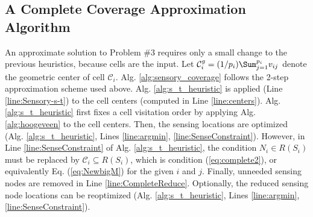 \documentclass[letterpaper, 10 pt, conference]{ieeeconf}
\theoremstyle{definition}
\newcommand{\Cs}{\mathcal{C}}
\begin{document}
\subsection{A Complete Coverage Approximation Algorithm}

\noindent An approximate solution to Problem $\# 3$  requires only a small change to the previous heuristics, because cells are the input.  Let $\Cs^g_i = (1/p_i) \Sum_{j=1}^{p_i}v_{ij} $ denote the geometric center of cell $\Cs_i$. Alg. \ref{alg:sensory_coverage} follows the 2-step approximation scheme used above. Alg. \ref{alg:s_t_heuristic} is applied (Line \ref{line:Sensory-s-t}) to the cell centers (computed in Line \ref{line:centers}).  Alg. \ref{alg:s_t_heuristic} first fixes a cell visitation order by applying Alg. \ref{alg:hoogeveen} to the cell centers.  Then, the sensing locations are optimized (Alg. \ref{alg:s_t_heuristic}, Lines \ref{line:argmin}, \ref{line:SenseConstraint}).  However, in Line \ref{line:SenseConstraint} of Alg. \ref{alg:s_t_heuristic}, the condition $N_i\in R(S_i)$ must be replaced by $\Cs_i\subseteq R(S_i)$, which is condition (\ref{eq:complete2}), or equivalently Eq. (\ref{eq:NewbigM}) for the given $i$ and $j$. Finally, unneeded sensing nodes are removed in Line \ref{line:CompleteReduce}. Optionally, the reduced sensing node locations can be reoptimized (Alg. \ref{alg:s_t_heuristic}, Lines \ref{line:argmin}, \ref{line:SenseConstraint}).
\end{document}
